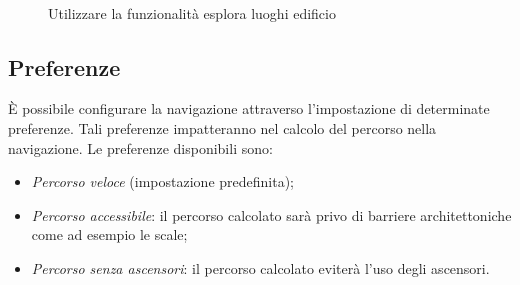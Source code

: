 \documentclass[../ClipsManualeUtente.tex]{subfiles}
\begin{document}
		\begin{figure} [p]
			\centering
			 \quad
			\hspace{1.5cm}
			 \\
			\caption{Utilizzare la funzionalità esplora luoghi edificio}
		\end{figure}
	
		
	\newpage
	\subsection{Preferenze}
		È possibile configurare la navigazione attraverso l'impostazione di determinate preferenze. Tali preferenze impatteranno nel calcolo del percorso nella navigazione.
		Le preferenze disponibili sono:
			\begin{itemize}
				\item \textit{Percorso veloce} (impostazione predefinita);
				\item \textit{Percorso accessibile}: il percorso calcolato sarà privo di barriere architettoniche come ad esempio le scale;
				\item \textit{Percorso senza ascensori}: il percorso calcolato eviterà l'uso degli ascensori.
			\end{itemize}
		
\end{document}
